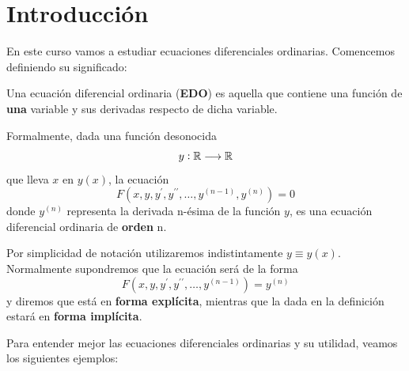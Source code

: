 \documentclass{mathnotes}
\title{\thetitle}
\author{\theauthor}
\date{Curso 2013 - 2014\\Universidad Autónoma de Madrid}
\begin{document}
\section{Introducción}

En este curso vamos a estudiar ecuaciones diferenciales ordinarias. Comencemos definiendo su significado:

\begin{definition}
Una ecuación diferencial ordinaria (\textbf{EDO}) es aquella que contiene una función de \textbf{una} variable y sus derivadas respecto de dicha variable.

Formalmente, dada una función desonocida $$y: \mathbb{R} \longrightarrow \mathbb{R}$$ que lleva $x$ en $y(x)$, la ecuación $$F(x, y, y^\prime, y^{\prime\prime},\hdots, y^{(n-1)}, y^{(n)}) = 0$$ donde $y^{(n)}$ representa la derivada n-ésima de la función $y$, es una ecuación diferencial ordinaria de \textbf{orden} n.
\end{definition}

Por simplicidad de notación utilizaremos indistintamente $y \equiv y(x)$.
Normalmente supondremos que la ecuación será de la forma $$F(x, y, y^\prime,y^{\prime\prime},\hdots, y^{(n-1)}) =  y^{(n)}$$
y diremos que está en \textbf{forma explícita}, mientras que la dada en la definición estará en \textbf{forma implícita}.

Para entender mejor las ecuaciones diferenciales ordinarias y su utilidad, veamos los siguientes ejemplos:
\end{document}
